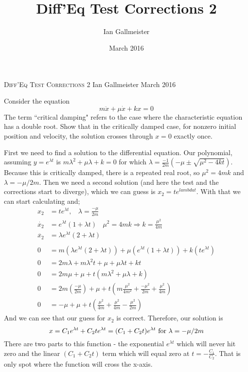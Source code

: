 \documentclass{article}
\title{Diff'Eq Test Corrections 2}
\author{Ian Gallmeister}
\date{March 2016}
\begin{document}
\Large
\textsc{Diff'Eq Test Corrections 2}
\newline \normalsize Ian Gallmeister
\newline March 2016


 Consider the equation
\[
m\ddot{x} + \mu\dot{x} + kx = 0
\]
The term ``critical damping" refers to the case where the characteristic equation has a double root.  Show that in the critically damped case, for nonzero initial position and velocity, the solution crosses through $x = 0$ exactly once.

\hangindent=20pt
\vspace{10pt}
\newline First we need to find a solution to the differential equation.  Our polynomial, assuming $y = e^{\lambda t}$ is $m\lambda^2 + \mu\lambda + k = 0$ for which $\displaystyle\lambda = \frac{-1}{2m}\left(-\mu \pm \sqrt{\mu^2 - 4kt}\right)$.  Because this is critically damped, there is a repeated real root, so $\mu^2 = 4mk$ and $\lambda = -\mu/2m$.  Then we need a second solution (and here the test and the corrections start to diverge), which we can guess is $x_2 = te^{lambda t}$.  With that we can start calculating and;
\begin{align*}
    x_2 &= te^{\lambda t}, \:\:\:\: \lambda = \frac{-\mu}{2m} \\
    \dot{x_2} &= e^{\lambda t}(1 + \lambda t) \:\:\:\: \mu^2 = 4mk \Rightarrow k = \frac{\mu^2}{4m} \\
    \ddot{x_2} &= \lambda e^{\lambda t}(2 + \lambda t) \\
    \\
    0 &= m\left(\lambda e^{\lambda t}(2 + \lambda t)\right) + \mu\left(e^{\lambda t}(1 + \lambda t)\right) + k\left(te^{\lambda t}\right) \\
    0 &= 2m\lambda + m\lambda^2t + \mu + \mu\lambda t + kt \\
    0 &= 2m\mu + \mu + t\left( m\lambda^2 + \mu\lambda + k\right)\\
    0 &= 2m\left(\frac{-\mu}{2m}\right) + \mu + t\left( m\frac{\mu^2}{4m^2} + \frac{-\mu^2}{2m} + \frac{\mu^2}{4m} \right) \\
    0 &= -\mu + \mu + t \left( \frac{\mu^2}{4m} + \frac{\mu^2}{4m} - \frac{\mu^2}{2m} \right)
\end{align*}
And we can see that our guess for $x_2$ is correct.  Therefore, our solution is 
\[
x = C_1e^{\lambda t} + C_2te^{\lambda t} = (C_1 + C_2t)e^{\lambda t} \hbox{ for } \lambda = -\mu/2m
\]
There are two parts to this function - the exponential $e^{\lambda t}$ which will never hit zero and the linear $(C_1 + C_2t)$ term which will equal zero at $t = -\frac{C_1}{C_2}$.  That is only spot where the function will cross the x-axis.
\end{document}
